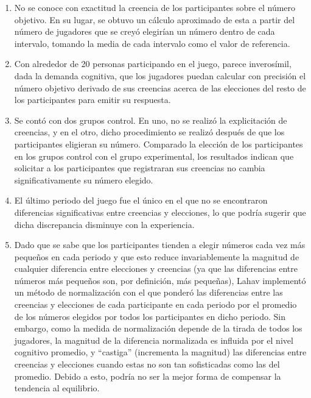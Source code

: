 \begin{enumerate}
\item No se conoce con exactitud la creencia de los participantes sobre el número objetivo. En su lugar, se obtuvo un cálculo aproximado de esta a partir del número de jugadores que se creyó elegirían un número dentro de cada intervalo, tomando la media de cada intervalo como el valor de referencia.\\

\item Con alrededor de 20 personas participando en el juego, parece inverosímil, dada la demanda cognitiva, que los jugadores puedan calcular con precisión el número objetivo derivado de sus creencias acerca de las elecciones del resto de los participantes para emitir su respuesta.\\

\item Se contó con dos grupos control. En uno,  no se realizó la explicitación de creencias, y en el otro, dicho procedimiento se realizó después de que los participantes eligieran su número. Comparado la elección de los participantes en los grupos control con el grupo experimental, los resultados indican que solicitar a los participantes que registraran sus creencias no cambia significativamente  su número elegido.\\

\item El último periodo del juego fue el único en el que no se encontraron diferencias significativas entre creencias y elecciones, lo que podría sugerir que dicha discrepancia disminuye con la experiencia.\\

\item Dado que se sabe que los participantes tienden a elegir números cada vez más pequeños en cada periodo y que esto reduce invariablemente la magnitud de cualquier diferencia entre elecciones y creencias (ya que las diferencias entre números más pequeños son, por definición, más pequeñas), Lahav implementó un método de normalización con el que ponderó las diferencias entre las creencias y elecciones de cada participante en cada periodo por el promedio de los números elegidos por todos los participantes en dicho periodo. Sin embargo, como la medida de normalización depende de la tirada de todos los jugadores, la magnitud de la diferencia normalizada es influida por el nivel cognitivo promedio, y “castiga” (incrementa la magnitud) las diferencias entre creencias y elecciones cuando estas no son tan sofisticadas como las del promedio. Debido a esto, podría no ser la mejor forma de compensar la tendencia al equilibrio.\\
\end{enumerate}

